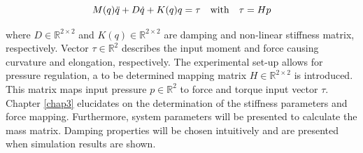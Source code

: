 \begin{equation}
    M(q)\Ddot{q} + D\dot{q} + K(q)q = \tau  \hspace{10pt} \text{with} \hspace{10pt} \tau = Hp
    \label{eq2:simp_model}
\end{equation}

where $D \in \mathbb{R}^{2 \times 2}$ and $K(q) \in \mathbb{R}^{2 \times 2}$ are damping and non-linear stiffness matrix, respectively. Vector $\tau \in \mathbb{R}^2$ describes the input moment and force causing curvature and elongation, respectively. The experimental set-up allows for pressure regulation, a to be determined mapping matrix $H \in \mathbb{R}^{2\times2}$ is introduced. This matrix maps input pressure $p \in \mathbb{R}^2$ to force and torque input vector $\tau$. Chapter \ref{chap3} elucidates on the determination of the stiffness parameters and force mapping. Furthermore, system parameters will be presented to calculate the mass matrix. Damping properties will be chosen intuitively and are presented when simulation results are shown.










